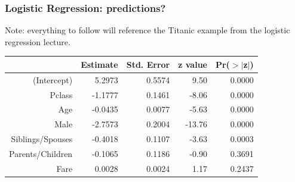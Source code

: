 \documentclass[aspectratio=169]{beamer}
\theoremstyle{principle}
\begin{document}
\begin{frame}
\frametitle{Logistic Regression: predictions?}

Note: everything to follow will reference the Titanic example from the logistic regression lecture.
\bigskip
\begin{table}[ht]
\centering
\begin{tabular}{rrrrr}
  \hline
    \hline
 & Estimate & Std. Error & z value & Pr($>$$|$z$|$) \\ 
  \hline
    \hline
(Intercept) & 5.2973 & 0.5574 & 9.50 & 0.0000 \\ 
  Pclass & -1.1777 & 0.1461 & -8.06 & 0.0000 \\ 
  Age & -0.0435 & 0.0077 & -5.63 & 0.0000 \\ 
  Male & -2.7573 & 0.2004 & -13.76 & 0.0000 \\ 
  Siblings/Spouses & -0.4018 & 0.1107 & -3.63 & 0.0003 \\ 
  Parents/Children & -0.1065 & 0.1186 & -0.90 & 0.3691 \\ 
  Fare & 0.0028 & 0.0024 & 1.17 & 0.2437 \\ 
   \hline
     \hline
\end{tabular}
\end{table}

\end{frame}
\end{document}
